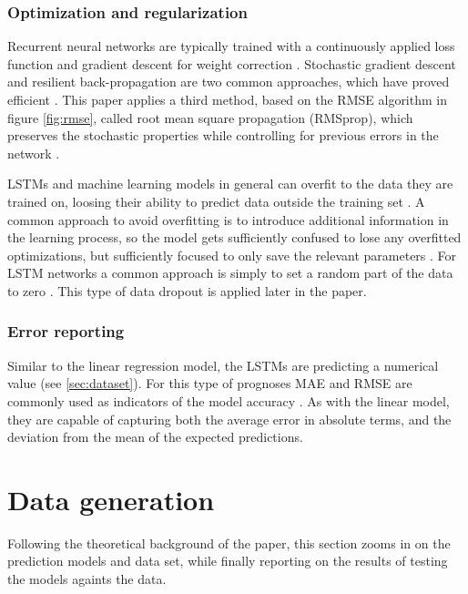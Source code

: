 \documentclass[a4paper]{article}
\begin{document}
\subsubsection{Optimization and regularization}
Recurrent neural networks are typically trained with a continuously applied
loss function and gradient descent for weight correction \citep{Russell2009,
Hochreiter1997, Schmidhuber2015}. Stochastic gradient descent and resilient
back-propagation are two common approaches, which have proved efficient
\citep{Russell2009, NILSSON2009}. This paper applies a third method, based on
the RMSE algorithm in figure \ref{fig:rmse}, called root mean square propagation
(RMSprop), which preserves the stochastic properties while controlling
for previous errors in the network \citep{Tieleman2012}.

LSTMs and machine learning models in general can overfit to the data
they are trained on, loosing their ability to predict data outside the training
set \citep{Russell2009, NILSSON2009}.
A common approach to avoid overfitting is to introduce additional
information in the learning process, so the model gets sufficiently confused
to lose any overfitted optimizations, but sufficiently focused to only save
the relevant parameters \citep{Schmidhuber2015, NILSSON2009}. For LSTM networks
a common approach is simply to set a random part of the data to zero
\citep{Schmidhuber2015}. This type of data dropout is applied later in the
paper.

\subsubsection{Error reporting}
Similar to the linear regression model, the LSTMs are predicting a numerical
value (see \ref{sec:dataset}). For this type of prognoses MAE and RMSE are
commonly used as indicators of the model accuracy
\citep{Russell2009, NILSSON2009, Schmidhuber2015}. As with the linear model,
they are capable of capturing both the average error in absolute terms,
and the deviation from the mean of the expected predictions.

\section{Data generation}
Following the theoretical background of the paper, this section zooms in on
the prediction models and data set, while finally reporting on the results of
testing the models againts the data.
\end{document}

